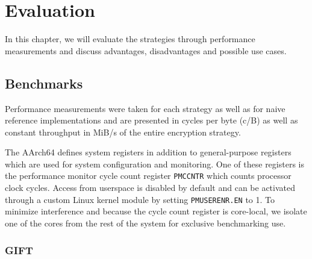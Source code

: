 \chapter{Evaluation}

In this chapter, we will evaluate the strategies through performance
measurements and discuss advantages, disadvantages and possible use cases.

\section{Benchmarks}

Performance measurements were taken for each strategy as well as for naive
reference implementations and are presented in cycles per byte (c/B) as well as
constant throughput in MiB/s of the entire encryption strategy.

The AArch64 defines system registers in addition to general-purpose registers
which are used for system configuration and monitoring. One of these registers
is the performance monitor cycle count register \texttt{PMCCNTR} which counts
processor clock cycles. Access from userspace is disabled by default and can be
activated through a custom Linux kernel module by setting \texttt{PMUSERENR.EN}
to 1. To minimize interference and because the cycle count register is
core-local, we isolate one of the cores from the rest of the system for
exclusive benchmarking use.

\subsection{GIFT}

